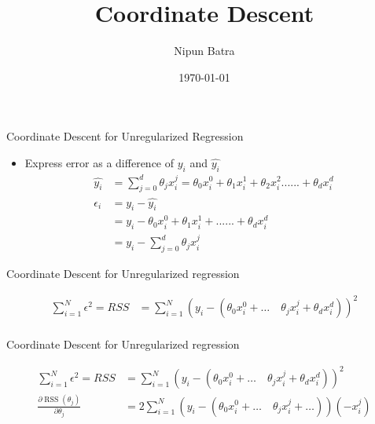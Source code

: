 \documentclass{beamer}
\title{Coordinate Descent}
\date{\today}
\author{Nipun Batra}
\institute{IIT Gandhinagar}
\begin{document}
  \maketitle
  
\begin{frame}{Coordinate Descent for Unregularized Regression}

\begin{itemize}[<+->]

    \item Express error as a difference of $y_{i}$ and $\hat{y_{i}}$
    \begin{align}
    \hat{y_i} &= \sum_{j=0}^{d} \theta_{j}x^{j}_{i} = \theta_{0}x_{i}^{0} + \theta_{1}x_{i}^{1} +\theta_{2}x_{i}^{2} ...... + \theta_{d}x_{i}^{d}  \\
    \epsilon_{i} &= y_{i} - \hat{y_{i}}\\
    &= y_{i} - \theta_{0}x_{i}^{0} + \theta_{1}x_{i}^{1} + ...... + \theta_{d}x_{i}^{d}\\
    &= y_{i} - \sum_{j=0}^{d} \theta_{j}x_{i}^{j}
    \end{align}
    
\end{itemize}
    

\end{frame}



\begin{frame}{Coordinate Descent for Unregularized regression}

\begin{align*}
    \sum_{i=1}^{N}  \epsilon^{2}=RSS &=\sum_{i=1}^{N}\left(y_{i}-\left(\theta_{0}x_{i}^{0}+\ldots \quad \theta_{j} x_{i}^{j}+\theta_{d} x_{i}^{d}\right)\right)^{2}\\
   \end{align*}
\end{frame}

\begin{frame}{Coordinate Descent for Unregularized regression}

\begin{align*}
\sum_{i=1}^{N}  \epsilon^{2}=RSS &=\sum_{i=1}^{N}\left(y_{i}-\left(\theta_{0}x_{i}^{0}+\ldots \quad \theta_{j} x_{i}^{j}+\theta_{d} x_{i}^{d}\right)\right)^{2}\\
\frac{\partial \operatorname{RSS}\left(\theta_{j}\right)}{\partial \theta_{j}}&= 2 \sum_{i=1}^{N}\left(y_{i}-\left(\theta_{0}x_{i}^{0}+\ldots \quad \theta_{j} x_{i}^{j}+\ldots \right)\right)\left(-x_{i}^{j}\right)\\
\end{align*}
\end{frame}
\end{document}
